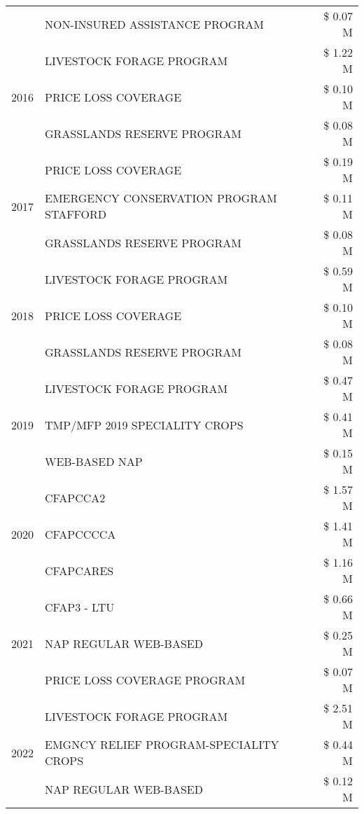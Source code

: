 \begin{tabular}{llr}
 & NON-INSURED ASSISTANCE PROGRAM & \$ 0.07 M \\
\cline{1-3}
\multirow[t]{3}{*}{2016} & LIVESTOCK FORAGE PROGRAM & \$ 1.22 M \\
 & PRICE LOSS COVERAGE & \$ 0.10 M \\
 & GRASSLANDS RESERVE PROGRAM & \$ 0.08 M \\
\cline{1-3}
\multirow[t]{3}{*}{2017} & PRICE LOSS COVERAGE & \$ 0.19 M \\
 & EMERGENCY CONSERVATION PROGRAM STAFFORD & \$ 0.11 M \\
 & GRASSLANDS RESERVE PROGRAM & \$ 0.08 M \\
\cline{1-3}
\multirow[t]{3}{*}{2018} & LIVESTOCK FORAGE PROGRAM & \$ 0.59 M \\
 & PRICE LOSS COVERAGE & \$ 0.10 M \\
 & GRASSLANDS RESERVE PROGRAM & \$ 0.08 M \\
\cline{1-3}
\multirow[t]{3}{*}{2019} & LIVESTOCK FORAGE PROGRAM & \$ 0.47 M \\
 & TMP/MFP 2019 SPECIALITY CROPS & \$ 0.41 M \\
 & WEB-BASED NAP & \$ 0.15 M \\
\cline{1-3}
\multirow[t]{3}{*}{2020} & CFAPCCA2 & \$ 1.57 M \\
 & CFAPCCCCA & \$ 1.41 M \\
 & CFAPCARES & \$ 1.16 M \\
\cline{1-3}
\multirow[t]{3}{*}{2021} & CFAP3 - LTU & \$ 0.66 M \\
 & NAP REGULAR WEB-BASED & \$ 0.25 M \\
 & PRICE LOSS COVERAGE PROGRAM & \$ 0.07 M \\
\cline{1-3}
\multirow[t]{3}{*}{2022} & LIVESTOCK FORAGE PROGRAM & \$ 2.51 M \\
 & EMGNCY RELIEF PROGRAM-SPECIALITY CROPS & \$ 0.44 M \\
 & NAP REGULAR WEB-BASED & \$ 0.12 M \\
\cline{1-3}
\bottomrule
\end{tabular}
